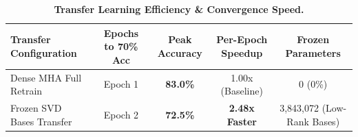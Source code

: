 \documentclass[journal]{IEEEtran}
\begin{document}
\begin{table}[h]
\centering
\small
\caption{\textbf{Transfer Learning Efficiency \& Convergence Speed.}}
\label{tab:transfer_efficiency}
\begin{tabular}{lcccc}
\toprule
\textbf{Transfer Configuration} & \textbf{Epochs to 70\% Acc} & \textbf{Peak Accuracy} & \textbf{Per-Epoch Speedup} & \textbf{Frozen Parameters} \\
\midrule
Dense MHA Full Retrain & Epoch 1 & \textbf{83.0\%} & 1.00x (Baseline) & 0 (0\%) \\
Frozen SVD Bases Transfer & Epoch 2 & \textbf{72.5\%} & \textbf{2.48x Faster} & 3,843,072 (Low-Rank Bases) \\
\bottomrule
\end{tabular}
\end{table}
\end{document}
